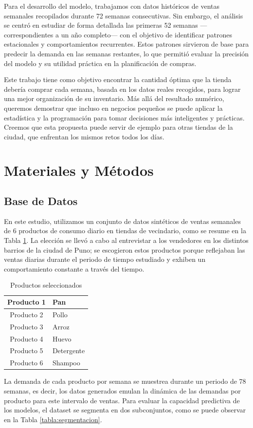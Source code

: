 \documentclass[12pt]{article}
\begin{document}
Para el desarrollo del modelo, trabajamos con datos históricos de ventas semanales recopilados durante 72 semanas consecutivas. Sin embargo, el análisis se centró en estudiar de forma detallada las primeras 52 semanas —correspondientes a un año completo— con el objetivo de identificar patrones estacionales y comportamientos recurrentes. Estos patrones sirvieron de base para predecir la demanda en las semanas restantes, lo que permitió evaluar la precisión del modelo y su utilidad práctica en la planificación de compras.

Este trabajo tiene como objetivo encontrar la cantidad óptima que la tienda debería comprar cada semana, basada en los datos reales recogidos, para lograr una mejor organización de su inventario. Más allá del resultado numérico, queremos demostrar que incluso en negocios pequeños se puede aplicar la estadística y la programación para tomar decisiones más inteligentes y prácticas. Creemos que esta propuesta puede servir de ejemplo para otras tiendas de la ciudad, que enfrentan los mismos retos todos los días.



\section{Materiales y Métodos}

\subsection{Base de Datos}

En este estudio, utilizamos un conjunto de datos sintéticos de ventas semanales de 6 productos de consumo diario en tiendas de vecindario, como se resume en la Tabla \ref{tabla:productos}. La elección se llevó a cabo al entrevistar a los vendedores en los distintos barrios de la ciudad de Puno; se escogieron estos productos porque reflejaban las ventas diarias durante el periodo de tiempo estudiado y exhiben un comportamiento constante a través del tiempo.

\begin{table}[H]
\centering
\caption{Productos seleccionados}
\label{tabla:productos}
\begin{tabular}{|c|l|}
\hline
Producto 1 & Pan        \\ \hline
Producto 2 & Pollo      \\ \hline
Producto 3 & Arroz      \\ \hline
Producto 4 & Huevo      \\ \hline
Producto 5 & Detergente \\ \hline
Producto 6 & Shampoo    \\ \hline
\end{tabular}
\end{table}
\vspace{0.5cm}
La demanda de cada producto por semana se muestrea durante un periodo de 78 semanas, es decir, los datos generados emulan la dinámica de las demandas por producto para este intervalo de ventas. Para evaluar la capacidad predictiva de los modelos, el dataset se segmenta en dos subconjuntos, como se puede observar en la Tabla \ref{tabla:segmentacion}.
\end{document}
